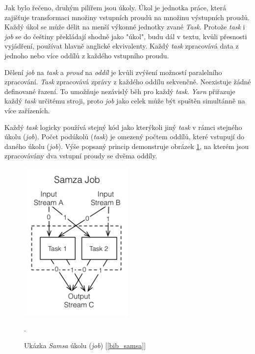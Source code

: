 \documentclass[
  digital, %
  table,   %
  nolof,     %
  nolot,     %
  oneside, %
  nocover,
  monochrome,
  12pt
]{fithesis3}
\begin{document}
Jak bylo řečeno, druhým pilířem jsou úkoly. Úkol je jednotka práce, která zajišťuje transformaci množiny vstupních proudů na množinu výstupních proudů. Každý úkol se může dělit na menší výkonné jednotky zvané \textit{Task}. Protože \textit{task} i \textit{job} se do češtiny překládají shodně jako "úkol", budu dál v textu, kvůli přesnosti vyjádření, používat hlavně anglické ekvivalenty. Každý \textit{task} zpracovává data z jednoho nebo více oddílů z každého vstupního proudu.

Dělení \textit{job} na \textit{task} a \textit{proud} na \textit{oddíl} je kvůli zvýšení možností paralelního zpracování. \textit{Task} zpracovává zprávy z každého oddílu sekvenčně. Neexistuje žádné definované řazení. To umožňuje nezávislý běh pro každý \textit{task}. \textit{Yarn} přiřazuje každý \textit{task} určitému stroji, proto \textit{job} jako celek může být spuštěn simultánně na více zařízeních.

Každý \textit{task} logicky používá stejný kód jako kterýkoli jiný \textit{task} v rámci stejného úkolu (\textit{job}). Počet podúkolů (\textit{task}) je omezený počtem oddílů, které vstupují do daného úkolu (\textit{job}). Výše popsaný princip demonstruje obrázek \ref{fig:samsa-concept}, na kterém jsou zpracovávány dva vstupní proudy se dvěma oddíly.

\begin{figure}[H]
	\centering
    \includegraphics[width=0.5\textwidth, height=0.5\textheight]{images/samsa-job-detail.png}
    \caption{Ukázka \textit{Samsa} úkolu (\textit{job}) [\ref{bib_samsa}]}.
    \label{fig:samsa-concept}
\end{figure}
\end{document}
